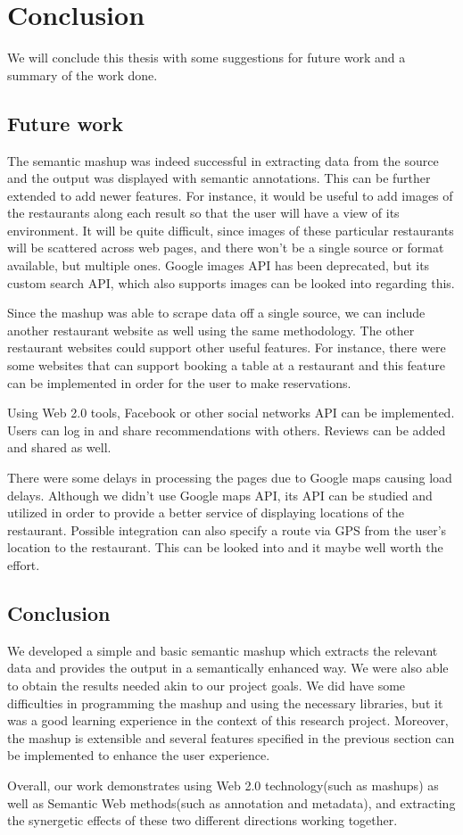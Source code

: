 \chapter{Conclusion}
We will conclude this thesis with some suggestions for future work and a summary of the work done.

\section{Future work}
The semantic mashup was indeed successful in extracting data from the source and the output was displayed with semantic annotations. This can be further extended to add newer features. For instance, it would be useful to add images of the restaurants along each result so that the user will have a view of its environment. It will be quite difficult, since images of these particular restaurants will be scattered across web pages, and there won’t be a single source or format available, but multiple ones. Google images API has been deprecated, but its custom search API, which also supports images can be looked into regarding this.

Since the mashup was able to scrape data off a single source, we can include another restaurant website as well using the same methodology. The other restaurant websites could support other useful features. For instance, there were some websites that can support booking a table at a restaurant and this feature can be implemented in order for the user to make reservations.

Using Web 2.0 tools, Facebook or other social networks API can be implemented. Users can log in and share recommendations with others. Reviews can be added and shared as well.

There were some delays in processing the pages due to Google maps causing load delays. Although we didn’t use Google maps API, its API can be studied and utilized in order to provide a better service of displaying locations of the restaurant. Possible integration can also specify a route via GPS from the user’s location to the restaurant. This can be looked into and it maybe well worth the effort.



\section{Conclusion}
We developed a simple and basic semantic mashup which extracts the relevant data and provides the output in a semantically enhanced way. We were also able to obtain the results needed akin to our project goals. We did have some difficulties in programming the mashup and using the necessary libraries, but it was a good learning experience in the context of this research project. Moreover, the mashup is extensible and several features specified in the previous section can be implemented to enhance the user experience.

Overall, our work demonstrates using Web 2.0 technology(such as mashups) as well as Semantic Web methods(such as annotation and metadata), and extracting the synergetic effects of these two different directions working together.


